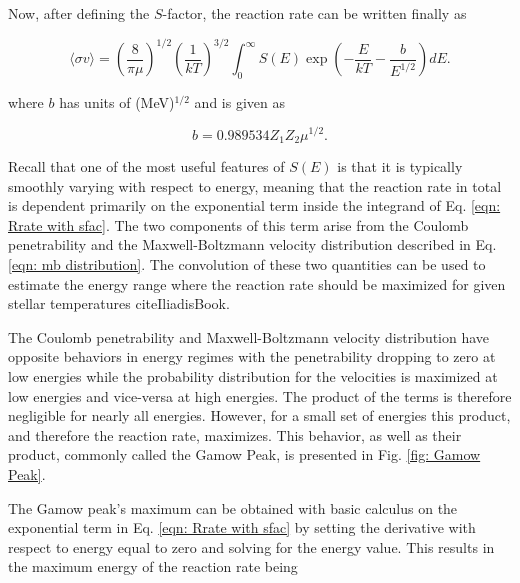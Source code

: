 Now, after defining the $S$-factor, the reaction rate can be written finally as 

\begin{equation}
\langle \sigma v \rangle = \left( \frac{8}{\pi \mu} \right) ^{1/2} \left( \frac{1}{kT} \right) ^{3/2} \int_{0}^{\infty} S (E) \exp \left(-\dfrac{E}{kT} - \dfrac{b}{E^{1/2}}\right) dE.
\label{eqn: Rrate with sfac}
\end{equation}

\noindent where $b$ has units of (MeV)$^{1/2}$ and is given as

\begin{equation}
b = 0.989534 Z_{1} Z_{2} \mu^{1/2}. 
\end{equation}

\noindent Recall that one of the most useful features of $S(E)$ is that it is typically smoothly varying with respect to energy, meaning that the reaction rate in total is dependent primarily on the exponential term inside the integrand of Eq. \ref{eqn: Rrate with sfac}. The two components of this term arise from the Coulomb penetrability and the Maxwell-Boltzmann velocity distribution described in Eq. \ref{eqn: mb distribution}. The convolution of these two quantities can be used to estimate the energy range where the reaction rate should be maximized for given stellar temperatures cite{IliadisBook}. 

The Coulomb penetrability and Maxwell-Boltzmann velocity distribution have opposite behaviors in energy regimes with the penetrability dropping to zero at low energies while the probability distribution for the velocities is maximized at low energies and vice-versa at high energies. The product of the terms is therefore negligible for nearly all energies. However, for a small set of energies this product, and therefore the reaction rate, maximizes. This behavior, as well as their product, commonly called the Gamow Peak, is presented in Fig. \ref{fig: Gamow Peak}. 

The Gamow peak's maximum can be obtained with basic calculus on the exponential term in Eq. \ref{eqn: Rrate with sfac} by setting the derivative with respect to energy equal to zero and solving for the energy value. This results in the maximum energy of the reaction rate being 

